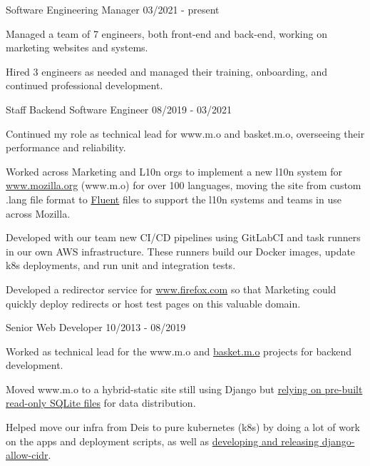 \documentclass[11pt]{article} %
\begin{document}
\begin{description}
\squish
{}
           {Software Engineering Manager}
           {03/2021 - present}

\item Managed a team of 7 engineers, both front-end and back-end, working on marketing websites and systems.

\item Hired 3 engineers as needed and managed their training, onboarding, and continued professional development.

           {Staff Backend Software Engineer}
           {08/2019 - 03/2021}

\item Continued my role as technical lead for www.m.o and basket.m.o, overseeing their performance and reliability.

\item Worked across Marketing and L10n orgs to implement a new l10n system for \href{https://github.com/mozilla/bedrock/}{www.mozilla.org} (www.m.o)
for over 100 languages, moving the site from custom .lang file format to \href{https://www.projectfluent.org/}{Fluent} files to support
the l10n systems and teams in use across Mozilla.

\item Developed with our team new CI/CD pipelines using GitLabCI and task runners in our own AWS infrastructure.
These runners build our Docker images, update k8s deployments, and run unit and integration tests.

\item Developed a redirector service for \href{https://github.com/mozmeao/www.firefox.com/}{www.firefox.com} so that Marketing could quickly deploy redirects or host
test pages on this valuable domain.

           {Senior Web Developer}
           {10/2013 - 08/2019}

\item Worked as technical lead for the www.m.o and \href{https://github.com/mozmeao/basket/}{basket.m.o} projects for backend development.

\item Moved www.m.o to a hybrid-static site still using Django but
\href{https://mozilla.github.io/meao/2018/03/28/bedrock-the-sqlitening/}{relying on pre-built read-only SQLite files} for
data distribution.

\item Helped move our infra from Deis to pure kubernetes (k8s) by doing a lot of work on the apps and deployment scripts,
as well as \href{https://mozilla.github.io/meao/2018/02/27/django-k8s-elb-health-checks/}{developing and releasing django-allow-cidr}.


\end{description}
\end{document}

